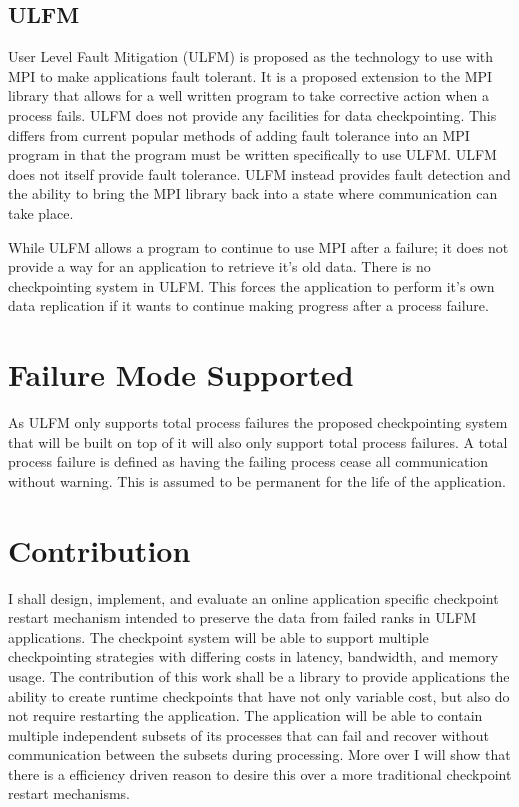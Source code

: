 \documentclass{article}
\begin{document}
\subsection{ULFM}
User Level Fault Mitigation (ULFM)\cite{ulfm-site} is proposed as the
technology to use with MPI to make applications fault tolerant. It is a
proposed extension to the MPI library that allows for a well written program
to take corrective action when a process fails. ULFM does not provide any
facilities for data checkpointing. This differs from current popular
methods of adding fault tolerance into an MPI program in that the program
must be written specifically to use ULFM. ULFM does not itself provide fault
tolerance. ULFM instead provides fault detection and the ability to bring
the MPI library back into a state where communication can take place. 

While ULFM allows a program to continue to use MPI after a failure; it does
not provide a way for an application to retrieve it's old data. There is no
checkpointing system in ULFM. This forces the application to perform it's
own data replication if it wants to continue making progress after a process
failure.

\section{Failure Mode Supported}
As ULFM only supports total process failures the proposed checkpointing
system that will be built on top of it will also only support total process
failures. A total process failure is defined as having the failing process
cease all communication without warning. This is assumed to be permanent for
the life of the application.


\section{Contribution}
I shall design, implement, and evaluate an online application specific
checkpoint restart mechanism intended to preserve the data from failed ranks
in ULFM
applications. The checkpoint system will be able to support multiple
checkpointing strategies with differing costs in latency, bandwidth, and
memory usage.
The contribution of this work shall be a library to provide applications the
ability to create runtime checkpoints that have not only variable cost, but
also do not require restarting the application. 
The application will be able to contain multiple independent subsets of its
processes that can fail and recover without communication between the
subsets during processing.  More over I will show that there is a
efficiency driven reason to desire this over a more traditional checkpoint
restart mechanisms. 
\end{document}
